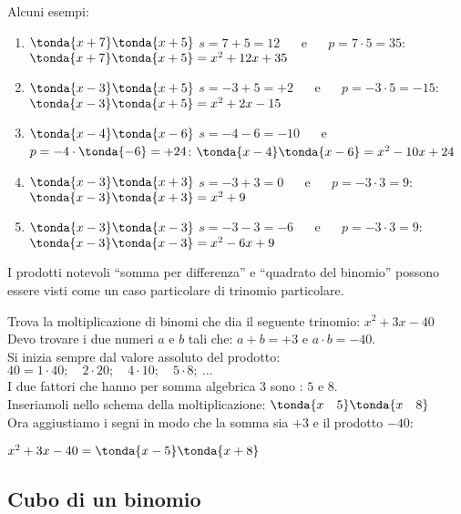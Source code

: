 \begin{esempio}
Alcuni esempi:
\begin{enumerate}
\item \(\tonda{x+7} \tonda{x+5}\) \quad \(s=7+5=12\) ~~ e ~~ 
\(p=7 \cdot 5=35\): \quad \(\tonda{x+7} \tonda{x+5}=x^2+12x+35\)
\item \(\tonda{x-3} \tonda{x+5}\) \quad \(s=-3+5=+2\) ~~ e ~~ 
\(p=-3 \cdot 5=-15\):\quad \(\tonda{x-3} \tonda{x+5}=x^2+2x-15\)
\item \(\tonda{x-4} \tonda{x-6}\) \quad \(s=-4-6=-10\) ~~ e ~~ 
\(p=-4 \cdot \tonda{-6}=+24\): \quad \(\tonda{x-4} \tonda{x-6}=x^2-10x+24\)
\item \(\tonda{x-3} \tonda{x+3}\) \quad \(s=-3+3=0\) ~~ e ~~ 
\(p=-3 \cdot 3=9\): \quad \(\tonda{x-3} \tonda{x+3}=x^2+9\)
\item \(\tonda{x-3} \tonda{x-3}\) \quad \(s=-3-3=-6\) ~~ e ~~ 
\(p=-3 \cdot 3=9\): \quad \(\tonda{x-3} \tonda{x-3}=x^2-6x+9\)
\end{enumerate}

\osservazione
I prodotti notevoli ``somma per differenza'' e ``quadrato del binomio'' 
possono essere visti come un caso particolare di trinomio particolare.
\end{esempio}

\begin{esempio}
Trova la moltiplicazione di binomi che dia il seguente trinomio:
\(x^2+3x-40\)\\
Devo trovare i due numeri \(a\) e \(b\) tali che: 
\(a+b=+3\) e \(a \cdot b=-40\). \\
Si inizia sempre dal valore assoluto del prodotto:\quad
\(40 = 1 \cdot 40; \quad 2 \cdot 20; \quad 4 \cdot 10; \quad 5 \cdot 8;~
\dots\)\\
I due fattori che hanno per somma algebrica \(3\) sono : \(5\) e \(8\).\\
Inseriamoli nello schema della moltiplicazione: \quad
\(\tonda{x \quad 5} \tonda{x \quad 8}\)\\
Ora aggiustiamo i segni in modo che 
la somma sia \(+3\) e il prodotto \(-40\):\\[-1em]
\begin{center}\(x^2+3x-40 = \tonda{x-5} \tonda{x+8}\)\end{center}
\end{esempio}

\subsection{Cubo di un binomio}
\label{subsec:11_prodnot_cubo}

